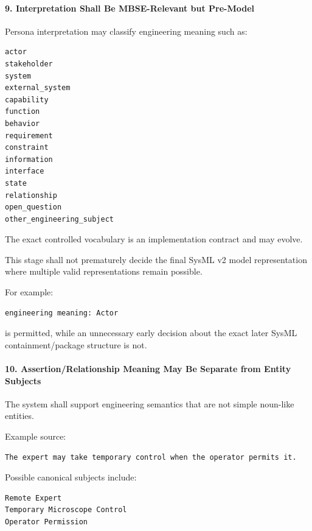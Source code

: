 \hypertarget{9-interpretation-shall-be-mbse-relevant-but-pre-model}{%
\paragraph{9. Interpretation Shall Be MBSE-Relevant but Pre-Model}\label{9-interpretation-shall-be-mbse-relevant-but-pre-model}}

Persona interpretation may classify engineering meaning such as:

\begin{verbatim}
actor
stakeholder
system
external_system
capability
function
behavior
requirement
constraint
information
interface
state
relationship
open_question
other_engineering_subject
\end{verbatim}

The exact controlled vocabulary is an implementation contract and may evolve.

This stage shall not prematurely decide the final SysML v2 model representation where multiple valid representations remain possible.

For example:

\begin{verbatim}
engineering meaning: Actor
\end{verbatim}

is permitted, while an unnecessary early decision about the exact later SysML containment/package structure is not.

\hypertarget{10-assertionrelationship-meaning-may-be-separate-from-entity-subjects}{%
\paragraph{10. Assertion/Relationship Meaning May Be Separate from Entity Subjects}\label{10-assertionrelationship-meaning-may-be-separate-from-entity-subjects}}

The system shall support engineering semantics that are not simple noun-like entities.

Example source:

\begin{verbatim}
The expert may take temporary control when the operator permits it.
\end{verbatim}

Possible canonical subjects include:

\begin{verbatim}
Remote Expert
Temporary Microscope Control
Operator Permission
\end{verbatim}

